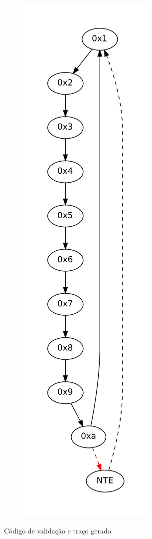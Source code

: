 \documentclass[12pt,twoside]{article}
\begin{document}
\begin{figure}[h!]
\begin{subfigure}[b]{0.3\textwidth}
	\includegraphics[scale=0.45]{./figs/validacao}
	\caption{}
	\label{fig-validacao}
\end{subfigure}

\caption{Código de validação e traço gerado.}
\label{valida_set}
\end{figure}
\end{document}
